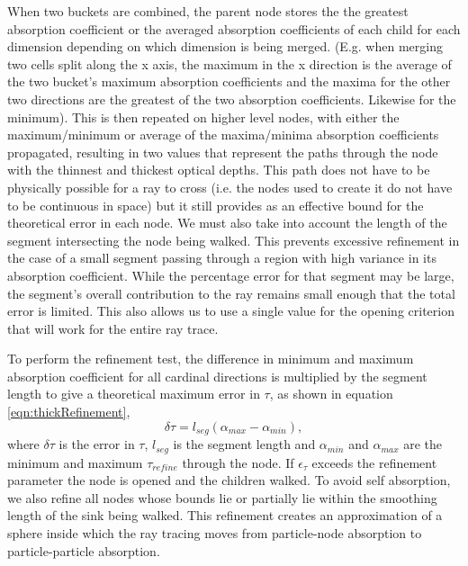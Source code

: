 When two buckets are combined, the parent node stores the the greatest absorption coefficient or the averaged absorption coefficients of each child for each dimension depending on which dimension is being merged. (E.g. when merging two cells split along the x axis, the maximum in the x direction is the average of the two bucket's maximum absorption coefficients and the maxima for the other two directions are the greatest of the two absorption coefficients. Likewise for the minimum). This is then repeated on higher level nodes, with either the maximum/minimum or average of the maxima/minima absorption coefficients propagated, resulting in two values that represent the paths through the node with the thinnest and thickest optical depths. This path does not have to be physically possible for a ray to cross (i.e. the nodes used to create it do not have to be continuous in space) but it still provides as an effective bound for the theoretical error in each node. We must also take into account the length of the segment intersecting the node being walked. This prevents excessive refinement in the case of a small segment passing through a region with high variance in its absorption coefficient. While the percentage error for that segment may be large, the segment's overall contribution to the ray remains small enough that the total error is limited. This also allows us to use a single value for the opening criterion that will work for the entire ray trace.

To perform the refinement test, the difference in minimum and maximum absorption coefficient for all cardinal directions is multiplied by the segment length to give a theoretical maximum error in $\tau$, as shown in equation \ref{eqn:thickRefinement},
\begin{equation}
    \delta\tau = l_{seg}(\alpha_{max} - \alpha_{min}),
    \label{eqn:thickRefinement}
\end{equation}
where $\delta\tau$ is the error in $\tau$, $l_{seg}$ is the segment length and $\alpha_{min}$ and $\alpha_{max}$ are the minimum and maximum $\tau_{refine}$ through the node. If $\epsilon_\tau$ exceeds the refinement parameter the node is opened and the children walked. To avoid self absorption, we also refine all nodes whose bounds lie or partially lie within the smoothing length of the sink being walked. This refinement creates an approximation of a sphere inside which the ray tracing moves from particle-node absorption to particle-particle absorption.

